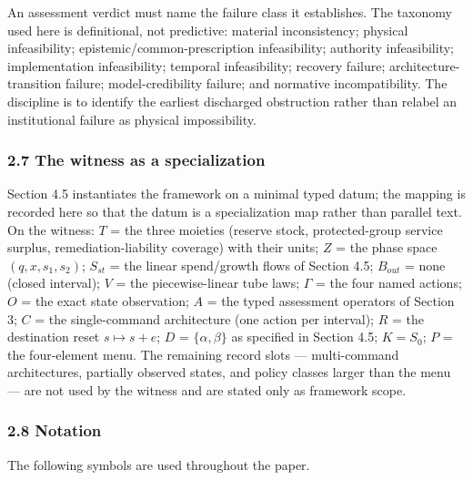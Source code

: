 \documentclass[11pt]{article}
\begin{document}
An assessment verdict must name the failure class it establishes. The
taxonomy used here is definitional, not predictive: material
inconsistency; physical infeasibility; epistemic/common-prescription
infeasibility; authority infeasibility; implementation infeasibility;
temporal infeasibility; recovery failure; architecture-transition
failure; model-credibility failure; and normative incompatibility. The
discipline is to identify the earliest discharged obstruction rather
than relabel an institutional failure as physical impossibility.

\subsubsection{2.7 The witness as a
specialization}\label{the-witness-as-a-specialization}

Section 4.5 instantiates the framework on a minimal typed datum; the
mapping is recorded here so that the datum is a specialization map
rather than parallel text. On the witness: \(T\) = the three moieties
(reserve stock, protected-group service surplus, remediation-liability
coverage) with their units; \(Z\) = the phase space
\((q, x, s_1, s_2)\); \(S_{st}\) = the linear spend/growth flows of
Section 4.5; \(B_{out}\) = none (closed interval); \(V\) = the
piecewise-linear tube laws; \(\Gamma\) = the four named actions; \(O\) =
the exact state observation; \(A\) = the typed assessment operators of
Section 3; \(C\) = the single-command architecture (one action per
interval); \(R\) = the destination reset \(s \mapsto s + e\); \(D\) =
\(\{\alpha, \beta\}\) as specified in Section 4.5; \(K = S_0\); \(P\) =
the four-element menu. The remaining record slots --- multi-command
architectures, partially observed states, and policy classes larger than
the menu --- are not used by the witness and are stated only as
framework scope.

\subsubsection{2.8 Notation}\label{notation}

The following symbols are used throughout the paper.
\end{document}
